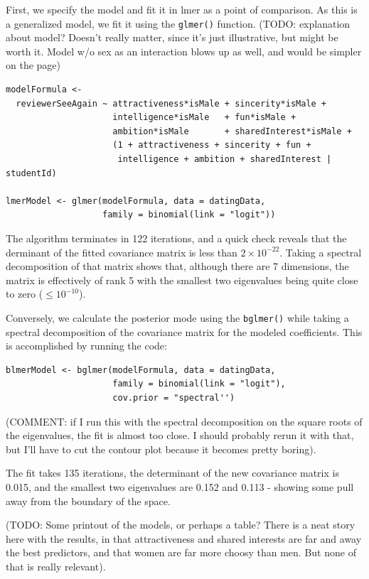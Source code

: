 \documentclass[10pt]{article}
\newcommand{\pkg}[1]{{\fontseries{b}\selectfont #1}}
\newcommand{\code}[1]{\texttt{#1}}
\begin{document}
First, we specify the model and fit it in \pkg{lmer} as a
point of comparison. As this is a generalized model, we fit it using
the \code{glmer()} function. (TODO: explanation about model? Doesn't
really matter, since it's just illustrative, but might be worth
it. Model w/o sex as an interaction blows up as well, and would be
simpler on the page)

\begin{verbatim}
modelFormula <-
  reviewerSeeAgain ~ attractiveness*isMale + sincerity*isMale +
                     intelligence*isMale   + fun*isMale +
                     ambition*isMale       + sharedInterest*isMale +
                     (1 + attractiveness + sincerity + fun +
                      intelligence + ambition + sharedInterest | studentId)

lmerModel <- glmer(modelFormula, data = datingData,
                   family = binomial(link = "logit"))
\end{verbatim}

The algorithm terminates in 122 iterations, and a quick check reveals that the
derminant of the fitted covariance matrix is less than
$2\times10^{-22}$. Taking a spectral decomposition of that matrix shows
that, although there are 7 dimensions, the matrix is effectively of rank 5 with the
smallest two eigenvalues being quite close to zero ($\leq
10^{-10}$).

Conversely, we calculate the posterior mode using the \code{bglmer()} while
taking a spectral decomposition of the covariance matrix for the
modeled coefficients. This is accomplished by running the code:

\begin{verbatim}
blmerModel <- bglmer(modelFormula, data = datingData,
                     family = binomial(link = "logit"),
                     cov.prior = "spectral'')
\end{verbatim}

(COMMENT: if I run this with the spectral decomposition on the square
roots of the eigenvalues, the fit is almost too close. I should
probably rerun it with that, but I'll have to cut the contour plot
because it becomes pretty boring).

The fit takes 135 iterations, the determinant of the new
covariance matrix is 0.015, and the smallest two eigenvalues are
0.152 and 0.113 - showing some pull away from the boundary of the space.

(TODO: Some printout of the models, or perhaps a table? There is a neat
story here with the results, in that attractiveness and shared
interests are far and away the best predictors, and that women are far
more choosy than men. But none of that is really relevant).
\end{document}
